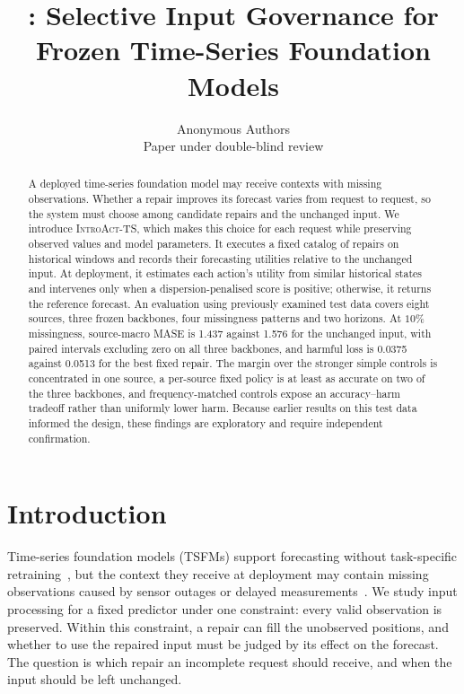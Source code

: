 \documentclass{article}
\title{\introact{}: Selective Input Governance for \\
Frozen Time-Series Foundation Models}
\author{Anonymous Authors\\Paper under double-blind review}
\newcommand{\introact}{\textsc{IntroAct-TS}}
\newcommand{\tsfm}{TSFM}
\begin{document}
\maketitle

\begin{abstract}
A deployed time-series foundation model may receive contexts with missing observations.
Whether a repair improves its forecast varies from request to request, so the system must
choose among candidate repairs and the unchanged input. We introduce \introact{}, which makes
this choice for each request while preserving observed values and model parameters. It
executes a fixed catalog of repairs on historical windows and records their forecasting
utilities relative to the unchanged input. At deployment, it estimates each action's utility
from similar historical states and intervenes only when a dispersion-penalised score is
positive; otherwise, it returns the reference forecast. An evaluation using previously
examined test data covers eight sources, three frozen backbones, four missingness patterns
and two horizons. At $10\%$ missingness, source-macro MASE is 1.437 against 1.576 for the
unchanged input, with paired intervals excluding zero on all three backbones, and harmful
loss is 0.0375 against 0.0513 for the best fixed repair. The margin over the stronger simple
controls is concentrated in one source, a per-source fixed policy is at least as accurate on
two of the three backbones, and frequency-matched controls expose an accuracy--harm tradeoff
rather than uniformly lower harm. Because earlier results on this test data informed the
design, these findings are exploratory and require independent confirmation.

\end{abstract}

\section{Introduction}
\label{sec:intro}

Time-series foundation models (\tsfm{}s) support forecasting without task-specific
retraining~\citep{ansari2024chronos,chronosbolt2025,das2024timesfm,woo2024moirai,chronos2_2025},
but the context they receive at deployment may contain missing observations caused by sensor
outages or delayed measurements~\citep{chen2024bitgraph,peng2025s4m}. We study input
processing for a fixed predictor under one constraint: every valid observation is preserved.
Within this constraint, a repair can fill the unobserved positions, and whether to use the
repaired input must be judged by its effect on the forecast. The question is which repair an
incomplete request should receive, and when the input should be left unchanged.
\end{document}
